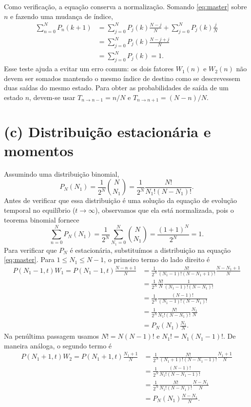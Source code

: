 \documentclass[12pt,a4paper]{article}
\begin{document}
Como verificação, a equação conserva a normalização. Somando \eqref{eq:master} sobre $n$ e fazendo uma mudança de índice,
%
\begin{align}
  \sum_{n=0}^{N}P_n(k+1)
  &=\sum_{j=0}^{N}P_j(k)\frac{N-j}{N}
   +\sum_{j=0}^{N}P_j(k)\frac{j}{N}\nonumber\\
  &=\sum_{j=0}^{N}P_j(k)\frac{N-j+j}{N}\nonumber\\
  &=\sum_{j=0}^{N}P_j(k)=1.
\end{align}
%
Esse teste ajuda a evitar um erro comum: os dois fatores $W_1(n)$ e $W_2(n)$ não devem ser somados mantendo o mesmo índice de destino como se descrevessem duas saídas do mesmo estado. Para obter as probabilidades de saída de um estado $n$, devem-se usar $T_{n\to n-1}=n/N$ e $T_{n\to n+1}=(N-n)/N$.
%
\section*{(c) Distribuição estacionária e momentos}
%
Assumindo uma distribuição binomial,
%
\begin{equation}
  P_N (N_1)=\frac{1}{2^N}\binom{N}{N_1}=\frac{1}{2^N}\frac{N!}{N_1!(N-N_1)!}.
  \label{eq:pi}
\end{equation}
%
Antes de verificar que essa distribuição é uma solução da equação de evolução temporal no equilíbrio ($t \rightarrow \infty$), observamos que ela está normalizada, pois o teorema binomial fornece
%
\begin{equation}
  \sum_{n=0}^{N}P_N(N_1)
  =\frac{1}{2^N}\sum_{N_1=0}^{N}\binom{N}{N_1}
  =\frac{(1+1)^N}{2^N}=1.
\end{equation}
%
Para verificar que $P_N$ é estacionária, substituímos a distribuição na equação \eqref{eq:master}. Para $1\leq N_1\leq N-1$, o primeiro termo do lado direito é
%
\begin{align}
  P(N_1-1, t)W_1 = P(N_1-1,t)\frac{N-n+1}{N}
  &=\frac{1}{2^N}\frac{N!}{(N_1-1)!(N-N_1+1)!}\frac{N-N_1+1}{N}\nonumber\\
  &=\frac{1}{2^N}\frac{N!}{N}\frac{1}{(N_1-1)!(N-N_1)!}\nonumber\\
  &=\frac{1}{2^N}\frac{(N-1)!}{(N_1-1)!(N-N_1)!}\nonumber\\
  &=\frac{1}{2^N}\frac{N!}{N_1!(N-N_1)!}\frac{N_1}{N}\\
  &=P_{N}(N_1)\frac{N_1}{N}.
  \label{eq:firststationaryterm}
\end{align}
%
Na penúltima passagem usamos $N!=N(N-1)!$ e $N_1!=N_1(N_1-1)!$. De maneira análoga, o segundo termo é
%
\begin{align}
  P(N_1+1,t) W_2 = P(N_1+1,t) \frac{N_1+1}{N}
  &=\frac{1}{2^N}\frac{N!}{(N_1+1)!(N-N_1-1)!}\frac{N_1+1}{N}\nonumber\\
  &=\frac{1}{2^N}\frac{(N-1)!}{N_1!(N-N_1-1)!}\nonumber\\
  &=\frac{1}{2^N}\frac{N!}{N_1!(N-N_1)!}\frac{N-N_1}{N}\nonumber\\
  &=P_N(N_1)\frac{N-N_1}{N}.
  \label{eq:secondstationaryterm}
\end{align}
\end{document}
